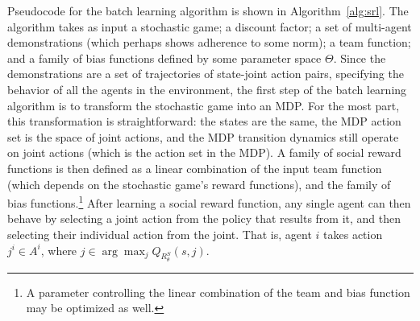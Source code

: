 Pseudocode for the batch learning algorithm is shown in Algorithm~\ref{alg:srl}.
%
The algorithm takes as input a stochastic game; a discount factor; a
set of multi-agent demonstrations (which perhaps shows adherence to
some norm); a team function; and a family of bias functions defined by
some parameter space $\Theta$. 
%
Since the demonstrations are a set of trajectories of state-joint
action pairs, specifying the behavior of all the agents in the
environment, the first step of the batch learning algorithm is to
transform the stochastic game into an MDP. For the most part, this
transformation is straightforward: the states are the same, the MDP
action set is the space of joint actions, and the MDP transition
dynamics still operate on joint actions (which is the action set in
the MDP). A family of social reward functions is then defined as a
linear combination of the input team function (which depends on the
stochastic game's reward functions), and the family of bias
functions.\footnote{A parameter controlling the linear
combination of the team and bias function may be optimized as well.}
%
After learning a social reward function, any single agent can then
behave by selecting a joint action from the policy that results from
it, and then selecting their individual action from the joint. That
is, agent $i$ takes action $j^i \in A^i$, where 
$j \in \arg \max_j Q_{R^S_\theta}(s, j)$.



